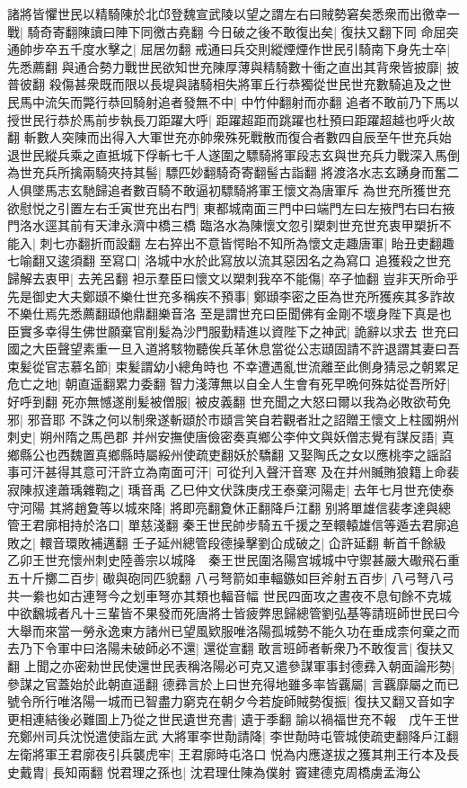 諸將皆懼世民以精騎陳於北邙登魏宣武陵以望之謂左右曰賊勢窘矣悉衆而出徼幸一戰|{
	騎奇寄翻陳讀曰陣下同徼古堯翻}
今日破之後不敢復出矣|{
	復扶又翻下同}
命屈突通帥步卒五千度水擊之|{
	屈居勿翻}
戒通曰兵交則縱煙煙作世民引騎南下身先士卒|{
	先悉薦翻}
與通合勢力戰世民欲知世充陳厚薄與精騎數十衝之直出其背衆皆披靡|{
	披普彼翻}
殺傷甚衆既而限以長堤與諸騎相失將軍丘行恭獨從世民世充數騎追及之世民馬中流矢而斃行恭回騎射追者發無不中|{
	中竹仲翻射而亦翻}
追者不敢前乃下馬以授世民行恭於馬前步執長刀距躍大呼|{
	距躍超距而跳躍也杜預曰距躍超越也呼火故翻}
斬數人突陳而出得入大軍世充亦帥衆殊死戰散而復合者數四自辰至午世充兵始退世民縱兵乘之直抵城下俘斬七千人遂圍之驃騎將軍段志玄與世充兵力戰深入馬倒為世充兵所擒兩騎夾持其髻|{
	驃匹妙翻騎奇寄翻髻古詣翻}
將渡洛水志玄踴身而奮二人俱墜馬志玄馳歸追者數百騎不敢逼初驃騎將軍王懷文為唐軍斥為世充所獲世充欲慰悦之引置左右壬寅世充出右門|{
	東都城南面三門中曰端門左曰左掖門右曰右掖門洛水逕其前有天津永濟中橋三橋}
臨洛水為陳懷文忽引槊刺世充世充衷甲槊折不能入|{
	刺七亦翻折而設翻}
左右猝出不意皆愕眙不知所為懷文走趣唐軍|{
	眙丑吏翻趣七喻翻又逡須翻}
至寫口|{
	洛城中水於此寫放以流其惡因名之為寫口}
追獲殺之世充歸解去衷甲|{
	去羌呂翻}
袒示羣臣曰懷文以槊刺我卒不能傷|{
	卒子恤翻}
豈非天所命乎先是御史大夫鄭頲不樂仕世充多稱疾不預事|{
	鄭頲李密之臣為世充所獲疾其多詐故不樂仕焉先悉薦翻頲他鼎翻樂音洛}
至是謂世充曰臣聞佛有金剛不壞身陛下真是也臣實多幸得生佛世願棄官削髪為沙門服勤精進以資陛下之神武|{
	詭辭以求去}
世充曰國之大臣聲望素重一旦入道將駭物聽俟兵革休息當從公志頲固請不許退謂其妻曰吾束髪從官志慕名節|{
	束髪謂幼小總角時也}
不幸遭遇亂世流離至此側身猜忌之朝累足危亡之地|{
	朝直遥翻累力委翻}
智力淺薄無以自全人生會有死早晩何殊姑從吾所好|{
	好呼到翻}
死亦無憾遂削髪被僧服|{
	被皮義翻}
世充聞之大怒曰爾以我為必敗欲苟免邪|{
	邪音耶}
不誅之何以制衆遂斬頲於市頲言笑自若觀者壯之詔贈王懷文上柱國朔州刺史|{
	朔州隋之馬邑郡}
并州安撫使唐儉密奏真鄉公李仲文與妖僧志覺有謀反語|{
	真鄉縣公也西魏置真鄉縣時屬綏州使疏吏翻妖於驕翻}
又娶陶氏之女以應桃李之謡諂事可汗甚得其意可汗許立為南面可汗|{
	可從刋入聲汗音寒}
及在并州贓賄狼籍上命裴寂陳叔達蕭瑀雜鞫之|{
	瑀音禹}
乙巳仲文伏誅庚戌王泰棄河陽走|{
	去年七月世充使泰守河陽}
其將趙夐等以城來降|{
	將即亮翻夐休正翻降戶江翻}
别將單雄信裴孝達與總管王君廓相持於洛口|{
	單慈淺翻}
秦王世民帥步騎五千援之至轘轅雄信等遁去君廓追敗之|{
	轘音環敗補邁翻}
壬子延州總管段德操擊劉仚成破之|{
	仚許延翻}
斬首千餘級　乙卯王世充懷州刺史陸善宗以城降　秦王世民圍洛陽宫城城中守禦甚嚴大礮飛石重五十斤擲二百步|{
	礮與砲同匹貌翻}
八弓弩箭如車輻鏃如巨斧射五百步|{
	八弓弩八弓共一絭也如古連弩今之划車弩亦其類也輻音幅}
世民四面攻之晝夜不息旬餘不克城中欲飜城者凡十三輩皆不果發而死唐將士皆疲弊思歸總管劉弘基等請班師世民曰今大舉而來當一勞永逸東方諸州已望風欵服唯洛陽孤城勢不能久功在垂成柰何棄之而去乃下令軍中曰洛陽未破師必不還|{
	還從宣翻}
敢言班師者斬衆乃不敢復言|{
	復扶又翻}
上聞之亦密勑世民使還世民表稱洛陽必可克又遣參謀軍事封德彞入朝面論形勢|{
	參謀之官蓋始於此朝直遥翻}
德彞言於上曰世充得地雖多率皆覊屬|{
	言覊靡屬之而已}
號令所行唯洛陽一城而已智盡力窮克在朝夕今若旋師賊勢復振|{
	復扶又翻又音如字}
更相連結後必難圖上乃從之世民遺世充書|{
	遺于季翻}
諭以禍福世充不報　戊午王世充鄭州司兵沈悦遣使詣左武大將軍李世勣請降|{
	李世勣時屯管城使疏吏翻降戶江翻}
左衛將軍王君廓夜引兵襲虎牢|{
	王君廓時屯洛口}
悦為内應遂拔之獲其荆王行本及長史戴胄|{
	長知兩翻}
悦君理之孫也|{
	沈君理仕陳為僕射}
竇建德克周橋虜孟海公

